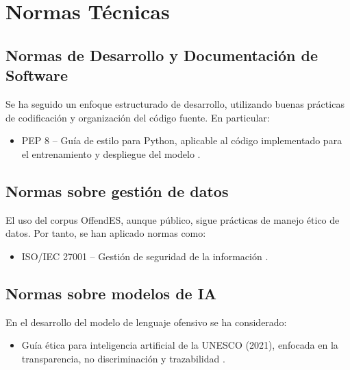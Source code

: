 \chapter{Normas Técnicas}

\section{Normas de Desarrollo y Documentación de Software}

Se ha seguido un enfoque estructurado de desarrollo, utilizando buenas prácticas de codificación y organización del código fuente. En particular:

\begin{itemize}
    \item PEP 8 -- Guía de estilo para Python, aplicable al código implementado para el entrenamiento y despliegue del modelo \cite{pep82025}.
\end{itemize}

\section{Normas sobre gestión de datos}

El uso del corpus OffendES, aunque público, sigue prácticas de manejo ético de datos. Por tanto, se han aplicado normas como:

\begin{itemize}
    \item ISO/IEC 27001 -- Gestión de seguridad de la información \cite{iso27001}.
\end{itemize}

\section{Normas sobre modelos de IA}

En el desarrollo del modelo de lenguaje ofensivo se ha considerado:

\begin{itemize}
    \item Guía ética para inteligencia artificial de la UNESCO (2021), enfocada en la transparencia, no discriminación y trazabilidad \cite{unesco2024ethics}.
\end{itemize}


